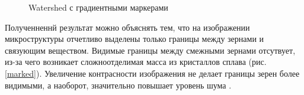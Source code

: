 \documentclass[a4paper, 14pt]{article}
\begin{document}
	\begin{figure}[h]
		\caption{Watershed с градиентными маркерами}
		\label{fig:watershed_grad}
	\end{figure}

	
	Полученненнй результат можно объяснять тем, что на изображении микроструктуры отчетливо выделены только границы между зернами и  связующим веществом. 
	Видимые границы между смежными зернами отсутвует, из-за чего возникает сложноотделимая масса из
	кристаллов сплава (рис. \ref{marked}). 
	Увеличение контрасности изображения не делает границы зерен более видимыми, а наоборот, значительно 
	повышает уровень шума .
	
\end{document}
